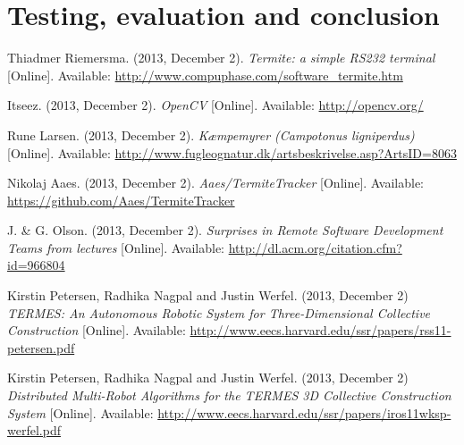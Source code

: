 \documentclass[oribibl]{llncs}
\begin{document}






\section{Testing, evaluation and conclusion}















%

\begin{thebibliography}{9}
    
		 Thiadmer Riemersma. (2013, December 2). \textit{Termite: a simple RS232 terminal} [Online]. Available: \url{http://www.compuphase.com/software_termite.htm}
        
         Itseez. (2013, December 2). \textit{OpenCV} [Online]. Available: \url{http://opencv.org/}
        
         Rune Larsen. (2013, December 2). \textit{Kæmpemyrer (Campotonus ligniperdus)} [Online]. Available: \url{http://www.fugleognatur.dk/artsbeskrivelse.asp?ArtsID=8063}
        
         Nikolaj Aaes. (2013, December 2). \textit{Aaes/TermiteTracker} [Online]. Available: \url{https://github.com/Aaes/TermiteTracker}
        
		 J. \& G. Olson. (2013, December 2). \textit{Surprises in Remote Software Development Teams from lectures} [Online]. Available: \url{http://dl.acm.org/citation.cfm?id=966804}
        
         Kirstin Petersen, Radhika Nagpal and Justin Werfel. (2013, December 2) \textit{TERMES: An Autonomous Robotic System for Three-Dimensional Collective Construction} [Online]. Available: \url{http://www.eecs.harvard.edu/ssr/papers/rss11-petersen.pdf}
        
         Kirstin Petersen, Radhika Nagpal and Justin Werfel. (2013, December 2) \textit{Distributed Multi-Robot Algorithms for the TERMES 3D Collective Construction System} [Online]. Available: \url{http://www.eecs.harvard.edu/ssr/papers/iros11wksp-werfel.pdf}
        
\end{thebibliography}

%
\end{document}
